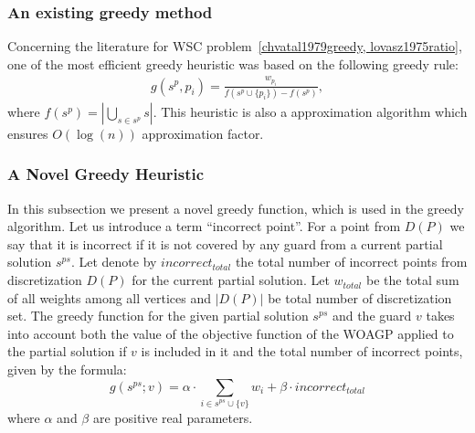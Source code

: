\documentclass[runningheads,a4paper]{elsarticle}
\begin{document}
     \subsubsection{An existing greedy method}
         
      Concerning the literature for WSC problem~\ref{chvatal1979greedy, lovasz1975ratio}, one of the most efficient greedy heuristic was based on the following greedy rule:
     \begin{align}
     g(s^p, p_i) = \frac{w_{p_i}}{ f(s^p \cup \{p_i\})  - f(s^p)},
     \end{align}
     where $f(s^p) = |\bigcup_{s \in s^p} s |$.
     This heuristic is also a approximation algorithm which ensures $O(\log(n))$ approximation factor.

        \subsubsection{A Novel Greedy Heuristic}
        In this subsection we present a novel greedy function, which is used in the greedy algorithm. Let us introduce a term  ``incorrect point''. For a point from $D(P)$ we say that it is incorrect if it is not covered by any guard from a current partial solution $s^{ps}$. Let denote by $incorrect_{total}$ the total number of incorrect points from discretization $D(P)$ for the current partial solution.  Let $w_{total}$ be the total sum of all weights among all vertices and $|D(P)|$ be total number of discretization set. The greedy function for the given partial solution $s^{ps}$ and the guard $v$ takes into account both the value of the objective function of the WOAGP  applied to the partial solution if $v$ is included in it and the total number of incorrect points, given by the formula:
        \begin{equation}\label{eq:greedyfun2}
				g(s^{ps}; v) = \alpha \cdot \sum_{i \in s^{ps} \cup \{v\}} w_i+ \beta \cdot {incorrect_{total}}
		\end{equation}
where $\alpha$ and $\beta$ are positive real parameters.
\end{document}
